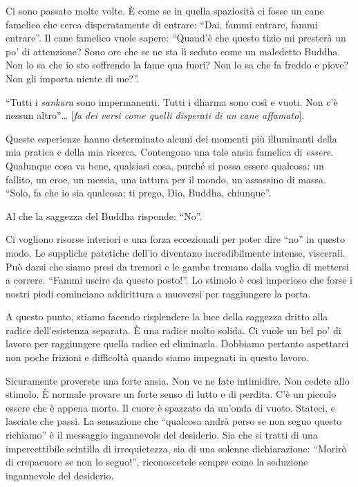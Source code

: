 Ci sono passato molte volte. È come se in quella spaziosità ci fosse un cane famelico che cerca disperatamente di entrare: ``Dai, fammi entrare, fammi entrare''. Il cane famelico vuole sapere: ``Quand'è che questo tizio mi presterà un po' di attenzione? Sono ore che se ne sta lì seduto come un maledetto Buddha. Non lo sa che io sto soffrendo la fame qua fuori? Non lo sa che fa freddo e piove? Non gli importa niente di me?''.

``Tutti i \textit{sankara }sono impermanenti. Tutti i dharma sono così e vuoti. Non c'è nessun altro''\ldots{} $[$\textit{fa dei versi come quelli disperati di un cane affamato$]$}. 

Queste esperienze hanno determinato alcuni dei momenti più illuminanti della mia pratica e della mia ricerca. Contengono una tale ansia famelica di \textit{essere}. Qualunque cosa va bene, qualsiasi cosa, purché si possa essere qualcosa: un fallito, un eroe, un messia, una iattura per il mondo, un assassino di massa. ``Solo, fa che io sia qualcosa; ti prego, Dio, Buddha, chiunque''.

Al che la saggezza del Buddha risponde: ``No''.

Ci vogliono risorse interiori e una forza eccezionali per poter dire ``no'' in questo modo. Le suppliche patetiche dell'io diventano incredibilmente intense, viscerali. Può darsi che siamo presi da tremori e le gambe tremano dalla voglia di mettersi a correre. ``Fammi uscire da questo posto!''. Lo stimolo è così imperioso che forse i nostri piedi cominciano addirittura a muoversi per raggiungere la porta.

A questo punto, stiamo facendo risplendere la luce della saggezza dritto alla radice dell'esistenza separata. È una radice molto solida. Ci vuole un bel po' di lavoro per raggiungere quella radice ed eliminarla. Dobbiamo pertanto aspettarci non poche frizioni e difficoltà quando siamo impegnati in questo lavoro.

Sicuramente proverete una forte ansia. Non ve ne fate intimidire. Non cedete allo stimolo. È normale provare un forte senso di lutto e di perdita. C'è un piccolo essere che è appena morto. Il cuore è spazzato da un'onda di vuoto. Stateci, e lasciate che passi. La sensazione che ``qualcosa andrà perso se non seguo questo richiamo'' è il messaggio ingannevole del desiderio. Sia che si tratti di una impercettibile scintilla di irrequietezza, sia di una solenne dichiarazione: ``Morirò di crepacuore se non lo seguo!'', riconoscetele sempre come la seduzione ingannevole del desiderio.

